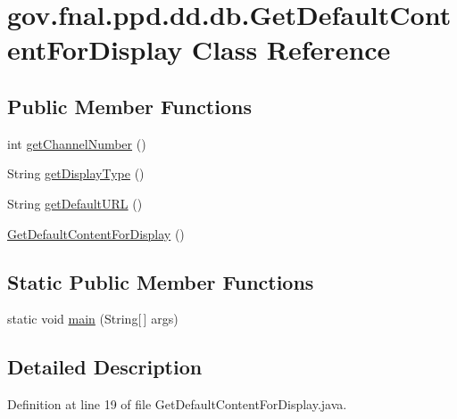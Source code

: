 \hypertarget{classgov_1_1fnal_1_1ppd_1_1dd_1_1db_1_1GetDefaultContentForDisplay}{\section{gov.\-fnal.\-ppd.\-dd.\-db.\-Get\-Default\-Content\-For\-Display Class Reference}
\label{classgov_1_1fnal_1_1ppd_1_1dd_1_1db_1_1GetDefaultContentForDisplay}
}
\subsection*{Public Member Functions}
\begin{DoxyCompactItemize}
\item 
int \hyperlink{classgov_1_1fnal_1_1ppd_1_1dd_1_1db_1_1GetDefaultContentForDisplay_a91c8a3eed831fa3bb4ad275d69b4ba02}{get\-Channel\-Number} ()
\item 
String \hyperlink{classgov_1_1fnal_1_1ppd_1_1dd_1_1db_1_1GetDefaultContentForDisplay_a4a29571d02723ece4c261d02f49c6624}{get\-Display\-Type} ()
\item 
String \hyperlink{classgov_1_1fnal_1_1ppd_1_1dd_1_1db_1_1GetDefaultContentForDisplay_a6bf210300f913dad893697e363b10943}{get\-Default\-U\-R\-L} ()
\item 
\hyperlink{classgov_1_1fnal_1_1ppd_1_1dd_1_1db_1_1GetDefaultContentForDisplay_ac29f1d17bc0b8de2def1a7dfb77ee9c9}{Get\-Default\-Content\-For\-Display} ()
\end{DoxyCompactItemize}
\subsection*{Static Public Member Functions}
\begin{DoxyCompactItemize}
\item 
static void \hyperlink{classgov_1_1fnal_1_1ppd_1_1dd_1_1db_1_1GetDefaultContentForDisplay_a016c5db98dc6eefab5561c34d8a5383d}{main} (String\mbox{[}$\,$\mbox{]} args)
\end{DoxyCompactItemize}


\subsection{Detailed Description}


Definition at line 19 of file Get\-Default\-Content\-For\-Display.\-java.



